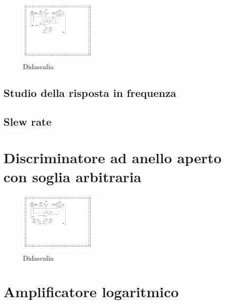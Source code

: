 \documentclass[journal]{IEEEtran}
\begin{document}
\begin{figure}[H]%
\begin {center}
\includegraphics[width=0.35\textwidth]{sch-simulations/output/OPA-closed-loop-non-inverting.pdf}
\caption{Didascalia}
\label{fig:oscilloscope}
\end {center}
\end{figure}

\subsection{Studio della risposta in frequenza}

\subsection{Slew rate}

\section{Discriminatore ad anello aperto con soglia arbitraria} %

\begin{figure}[H]%
\begin {center}
\includegraphics[width=0.35\textwidth]{sch-simulations/output/OPA-biased.pdf}
\caption{Didascalia}
\label{fig:oscilloscope}
\end {center}
\end{figure}


\section{Amplificatore logaritmico} %
\end{document}
